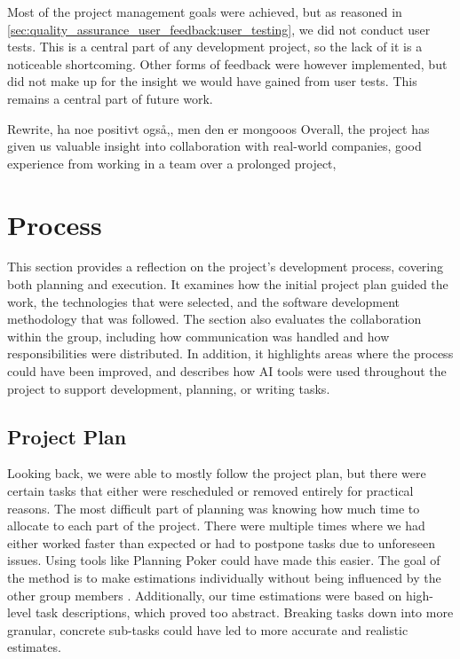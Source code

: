 Most of the project management goals were achieved, but as reasoned in \autoref{sec:quality_assurance_user_feedback:user_testing}, we did not conduct user tests. This is a central part of any development project, so the lack of it is a noticeable shortcoming. Other forms of feedback were however implemented, but did not make up for the insight we would have gained from user tests. This remains a central part of future work.

Rewrite, ha noe positivt også,, men den er mongooos
Overall, the project has given us valuable insight into collaboration with real-world companies, good experience from working in a team over a prolonged project, 

\section{Process}\label{sec:discussion:process}

This section provides a reflection on the project's development process, covering both planning and execution. It examines how the initial project plan guided the work, the technologies that were selected, and the software development methodology that was followed. The section also evaluates the collaboration within the group, including how communication was handled and how responsibilities were distributed. In addition, it highlights areas where the process could have been improved, and describes how AI tools were used throughout the project to support development, planning, or writing tasks.

\subsection{Project Plan}\label{subsec:discussion:process:projectplan}

Looking back, we were able to mostly follow the project plan, but there were certain tasks that either were rescheduled or removed entirely for practical reasons. The most difficult part of planning was knowing how much time to allocate to each part of the project. There were multiple times where we had either worked faster than expected or had to postpone tasks due to unforeseen issues. Using tools like Planning Poker could have made this easier. The goal of the method is to make estimations individually without being influenced by the other group members \cite{planningpokerwiki}. Additionally, our time estimations were based on high-level task descriptions, which proved too abstract. Breaking tasks down into more granular, concrete sub-tasks could have led to more accurate and realistic estimates.

